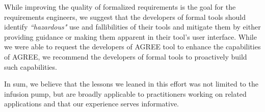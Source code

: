 While improving the quality of formalized requirements is the goal for the requirements engineers, we suggest that the developers of formal tools should identify \emph{``hazardous"} use and fallibilities of their tools and mitigate them by either providing guidance or making them apparent in their tool's user interface. While we were able to request the developers of AGREE tool to enhance the capabilities of AGREE, we recommend the developers of formal tools to proactively build such capabilities.

In sum, we believe that the lessons we leaned in this effort was not limited to the infusion pump, but are broadly applicable to practitioners working on related applications and that our experience serves informative.







